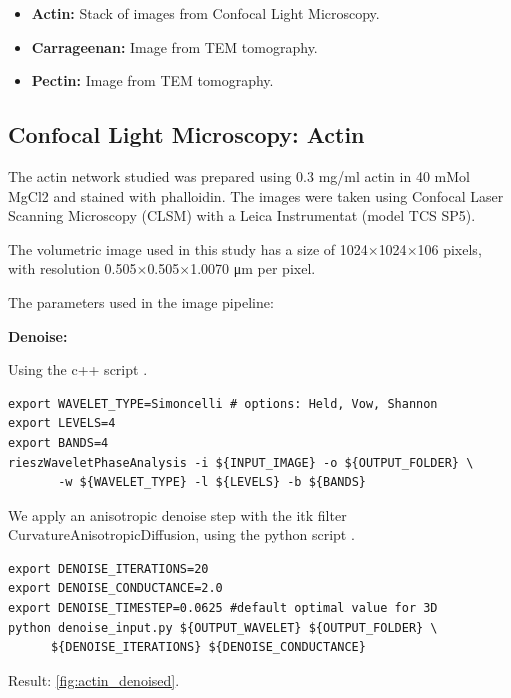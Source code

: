 \begin{itemize}[topsep=0pt]
  \item \textbf{Actin: } Stack of images from Confocal Light Microscopy.
  \item \textbf{Carrageenan: } Image from \gls{TEM} tomography.
  \item \textbf{Pectin: } Image from \gls{TEM} tomography.
\end{itemize}

\subsection{Confocal Light Microscopy: Actin}%
\label{sub:actin}

The actin network studied was prepared using 0.3 mg/ml actin in 40 mMol MgCl2 and stained with phalloidin.
The images were taken using Confocal Laser Scanning Microscopy (CLSM) with a Leica Instrumentat (model TCS SP5).

The volumetric image used in this study has a size of 1024$\times$1024$\times$106 pixels, with resolution 0.505$\times$0.505$\times$1.0070 \si{\micro\metre} per pixel.

The parameters used in the image pipeline:

\textbf{Denoise:}

\noindent Using the c++ script  \cite{phcerdan_rieszwaveletphaseanalysis_2018}.
\begin{verbatim}
export WAVELET_TYPE=Simoncelli # options: Held, Vow, Shannon
export LEVELS=4
export BANDS=4
rieszWaveletPhaseAnalysis -i ${INPUT_IMAGE} -o ${OUTPUT_FOLDER} \
       -w ${WAVELET_TYPE} -l ${LEVELS} -b ${BANDS}
\end{verbatim}

We apply an anisotropic denoise step with the itk filter CurvatureAnisotropicDiffusion,
using the python script  \citetitle*{phcerdan_denoise_input_2018} \cite{phcerdan_denoise_input_2018}.

\begin{verbatim}
export DENOISE_ITERATIONS=20
export DENOISE_CONDUCTANCE=2.0
export DENOISE_TIMESTEP=0.0625 #default optimal value for 3D
python denoise_input.py ${OUTPUT_WAVELET} ${OUTPUT_FOLDER} \
      ${DENOISE_ITERATIONS} ${DENOISE_CONDUCTANCE}
\end{verbatim}

Result: \autoref{fig:actin_denoised}.

